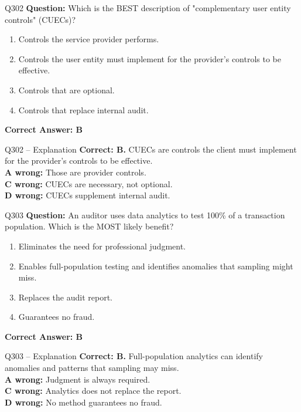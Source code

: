 \documentclass[aspectratio=169,10pt]{beamer}
\begin{document}
	\begin{frame}[t]{Q302}
		\small
		\textbf{Question:} Which is the BEST description of "complementary user entity controls" (CUECs)?
		\begin{enumerate}[label=\Alph*.,itemsep=1pt,topsep=2pt]
			\item Controls the service provider performs.
			\item Controls the user entity must implement for the provider's controls to be effective.
			\item Controls that are optional.
			\item Controls that replace internal audit.
		\end{enumerate}
		\vspace{4pt}
		\textbf{Correct Answer: B}
	\end{frame}
	
	\begin{frame}[t]{Q302 -- Explanation}
		\small
		\textbf{Correct: B.} CUECs are controls the client must implement for the provider's controls to be effective. \\[4pt]
		\textbf{A wrong:} Those are provider controls. \\[2pt]
		\textbf{C wrong:} CUECs are necessary, not optional. \\[2pt]
		\textbf{D wrong:} CUECs supplement internal audit.
	\end{frame}
	
	\begin{frame}[t]{Q303}
		\small
		\textbf{Question:} An auditor uses data analytics to test 100\% of a transaction population. Which is the MOST likely benefit?
		\begin{enumerate}[label=\Alph*.,itemsep=1pt,topsep=2pt]
			\item Eliminates the need for professional judgment.
			\item Enables full-population testing and identifies anomalies that sampling might miss.
			\item Replaces the audit report.
			\item Guarantees no fraud.
		\end{enumerate}
		\vspace{4pt}
		\textbf{Correct Answer: B}
	\end{frame}
	
	\begin{frame}[t]{Q303 -- Explanation}
		\small
		\textbf{Correct: B.} Full-population analytics can identify anomalies and patterns that sampling may miss. \\[4pt]
		\textbf{A wrong:} Judgment is always required. \\[2pt]
		\textbf{C wrong:} Analytics does not replace the report. \\[2pt]
		\textbf{D wrong:} No method guarantees no fraud.
	\end{frame}
	
\end{document}
